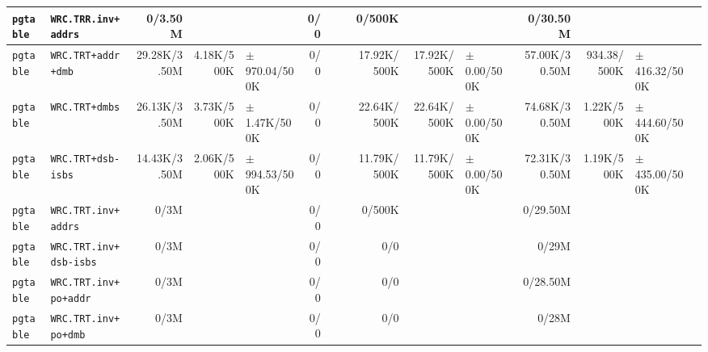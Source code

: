 \begin{tabular}{l l  | r r l | r r l | r r l | r r l l}
        \verb|pgtable| &                                   \verb|WRC.TRR.inv+addrs| &        0/3.50M &                       &                   &            0/0 &                       &  &         0/500K &                       &                   &       0/30.50M &                       &                   & \\ \hline 
        \verb|pgtable| &                                    \verb|WRC.TRT+addr+dmb| &   29.28K/3.50M &            4.18K/500K & $\pm$ 970.04/500K &            0/0 &                       &  &    17.92K/500K &           17.92K/500K &   $\pm$ 0.00/500K &  57.00K/30.50M &           934.38/500K & $\pm$ 416.32/500K & \\ \hline 
        \verb|pgtable| &                                        \verb|WRC.TRT+dmbs| &   26.13K/3.50M &            3.73K/500K &  $\pm$ 1.47K/500K &            0/0 &                       &  &    22.64K/500K &           22.64K/500K &   $\pm$ 0.00/500K &  74.68K/30.50M &            1.22K/500K & $\pm$ 444.60/500K & \\ \hline 
        \verb|pgtable| &                                    \verb|WRC.TRT+dsb-isbs| &   14.43K/3.50M &            2.06K/500K & $\pm$ 994.53/500K &            0/0 &                       &  &    11.79K/500K &           11.79K/500K &   $\pm$ 0.00/500K &  72.31K/30.50M &            1.19K/500K & $\pm$ 435.00/500K & \\ \hline 
        \verb|pgtable| &                                   \verb|WRC.TRT.inv+addrs| &           0/3M &                       &                   &            0/0 &                       &  &         0/500K &                       &                   &       0/29.50M &                       &                   & \\ \hline 
        \verb|pgtable| &                                \verb|WRC.TRT.inv+dsb-isbs| &           0/3M &                       &                   &            0/0 &                       &  &            0/0 &                       &                   &          0/29M &                       &                   & \\ \hline 
        \verb|pgtable| &                                 \verb|WRC.TRT.inv+po+addr| &           0/3M &                       &                   &            0/0 &                       &  &            0/0 &                       &                   &       0/28.50M &                       &                   & \\ \hline 
        \verb|pgtable| &                                  \verb|WRC.TRT.inv+po+dmb| &           0/3M &                       &                   &            0/0 &                       &  &            0/0 &                       &                   &          0/28M &                       &                   & \\ \hline 

\end{tabular}
